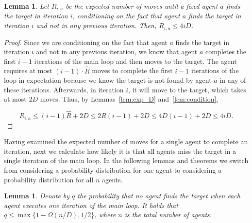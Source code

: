 \documentclass[11pt]{article}
\newtheorem{lemma}[theorem]{Lemma}
\begin{document}
\begin{lemma}
\label{lem:ria}
Let $R_{i,a}$ be the expected number of moves until a fixed agent $a$ finds the target in iteration $i$, conditioning on the fact that agent $a$ finds the target in iteration $i$ and not in any previous iteration. Then, $R_{i,a} \leq 4iD$.
\end{lemma}
\begin{proof}
 Since we are conditioning on the fact that agent $a$ finds the target in iteration $i$ and not in any previous iteration, we know that agent $a$ completes the first $i-1$ iterations of the main loop and then moves to the target. The agent requires at most $(i-1)\cdot \hat{R}$ moves to complete the first $i-1$ iterations of the loop in expectation because we know the target is not found by  agent $a$ in any of these iterations. Afterwards, in iteration $i$, it will move to the target, which takes at most $2D$ moves. Thus, by Lemmas~\ref{lem:exp_D} and~\ref{lem:condition}, 

\begin{equation*}
R_{i,a} \leq (i-1) \hat{R} + 2D \leq 2 R (i-1) + 2D \leq 4D(i-1) + 2D \leq 4iD.
\end{equation*}
\end{proof}

Having examined the expected number of moves for a single agent to complete an iteration, next we calculate how likely it is that all agents miss the target in a single iteration of the main loop. In the following lemmas and theorems we  switch from considering a probability distribution for one agent to considering a probability distribution for all $n$ agents.

\begin{lemma}
\label{lem:iterations}
	Denote by $q$ the probability that no agent finds the target when each agent executes one iteration of the main loop. It holds that $q \leq \max\{1-\Omega(n/D),1/2\}$, where $n$ is the total number of agents.
\end{lemma}
\end{document}
